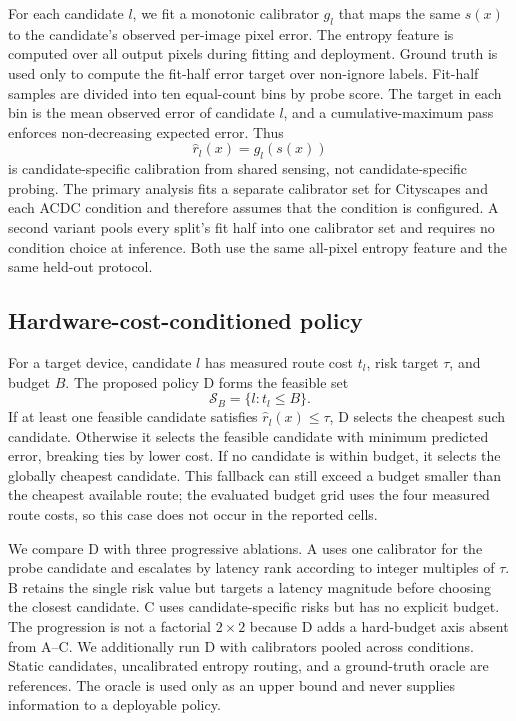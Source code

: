 \documentclass[a4paper,review,12pt]{elsarticle}
\begin{document}
For each candidate $l$, we fit a monotonic calibrator $g_l$ that maps the same $s(x)$ to the candidate's observed per-image pixel error. The entropy feature is computed over all output pixels during fitting and deployment. Ground truth is used only to compute the fit-half error target over non-ignore labels. Fit-half samples are divided into ten equal-count bins by probe score. The target in each bin is the mean observed error of candidate $l$, and a cumulative-maximum pass enforces non-decreasing expected error. Thus
\begin{equation}
\widehat{r}_l(x)=g_l(s(x))
\label{eq:risk}
\end{equation}
is candidate-specific calibration from shared sensing, not candidate-specific probing. The primary analysis fits a separate calibrator set for Cityscapes and each ACDC condition and therefore assumes that the condition is configured. A second variant pools every split's fit half into one calibrator set and requires no condition choice at inference. Both use the same all-pixel entropy feature and the same held-out protocol.

\subsection{Hardware-cost-conditioned policy}
\label{sec:policy}

For a target device, candidate $l$ has measured route cost $t_l$, risk target $\tau$, and budget $B$. The proposed policy D forms the feasible set
\begin{equation}
\mathcal{S}_B=\{l:t_l\leq B\}.
\label{eq:feasible}
\end{equation}
If at least one feasible candidate satisfies $\widehat{r}_l(x)\leq\tau$, D selects the cheapest such candidate. Otherwise it selects the feasible candidate with minimum predicted error, breaking ties by lower cost. If no candidate is within budget, it selects the globally cheapest candidate. This fallback can still exceed a budget smaller than the cheapest available route; the evaluated budget grid uses the four measured route costs, so this case does not occur in the reported cells.

We compare D with three progressive ablations. A uses one calibrator for the probe candidate and escalates by latency rank according to integer multiples of $\tau$. B retains the single risk value but targets a latency magnitude before choosing the closest candidate. C uses candidate-specific risks but has no explicit budget. The progression is not a factorial $2\times2$ because D adds a hard-budget axis absent from A--C. We additionally run D with calibrators pooled across conditions. Static candidates, uncalibrated entropy routing, and a ground-truth oracle are references. The oracle is used only as an upper bound and never supplies information to a deployable policy.
\end{document}
